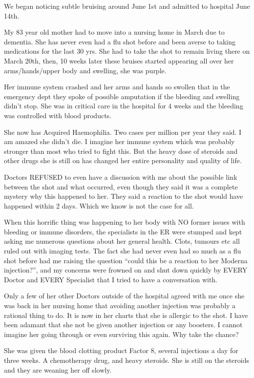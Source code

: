 We began noticing subtle bruising around June 1st and admitted to hospital June
14th.

My 83 year old mother had to move into a nursing home in March due to
dementia. She has never even had a flu shot before and been averse to taking
medications for the last 30 yrs. She had to take the shot to remain living there
on March 20th, then, 10 weeks later these bruises started appearing all over her
arms/hands/upper body and swelling, she was purple.

Her immune system crashed and her arms and hands so swollen that in the
emergency dept they spoke of possible amputation if the bleeding and swelling
didn’t stop. She was in critical care in the hospital for 4 weeks and the
bleeding was controlled with blood products.

She now has Acquired Haemophilia. Two cases per million per year they said. I am
amazed she didn’t die. I imagine her immune system which was probably stronger
than most who tried to fight this. But the heavy dose of steroids and other
drugs she is still on has changed her entire personality and quality of life.

Doctors REFUSED to even have a discussion with me about the possible link
between the shot and what occurred, even though they said it was a complete
mystery why this happened to her. They said a reaction to the shot would have
happened within 2 days. Which we know is not the case for all.

When this horrific thing was happening to her body with NO former issues with
bleeding or immune disorders, the specialists in the ER were stumped and kept
asking me numerous questions about her general health. Clots, tumours etc all
ruled out with imaging tests. The fact she had never even had so much as a flu
shot before had me raising the question “could this be a reaction to her Moderna
injection?”, and my concerns were frowned on and shut down quickly by EVERY
Doctor and EVERY Specialist that I tried to have a conversation with.

Only a few of her other Doctors outside of the hospital agreed with me once she
was back in her nursing home that avoiding another injection was probably a
rational thing to do. It is now in her charts that she is allergic to the
shot. I have been adamant that she not be given another injection or any
boosters. I cannot imagine her going through or even surviving this again. Why
take the chance?

She was given the blood clotting product Factor 8, several injections a day for
three weeks. A chemotherapy drug, and heavy steroids. She is still on the
steroids and they are weaning her off slowly.

